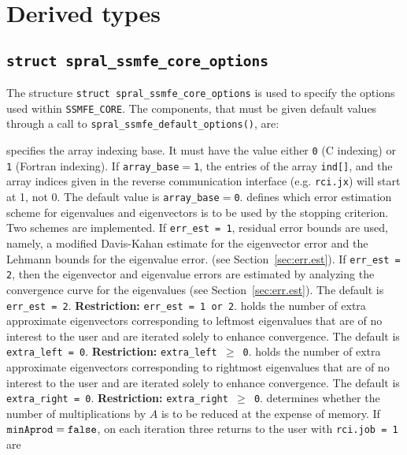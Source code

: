 \section{Derived types}
\subsection{\texttt{struct spral\_ssmfe\_core\_options}} \label{ssmfe:type:options}

The structure {\tt struct spral\_ssmfe\_core\_options} is used to specify
the options used within {\tt SSMFE\_CORE}. The components, that must be given
default values through a call to \texttt{spral\_ssmfe\_default\_options()}, are:

\begin{description}
%
 specifies the array indexing base. It must
   have the value either \texttt{0} (C indexing) or \texttt{1} (Fortran
   indexing). If \texttt{array\_base}$=$\texttt{1}, the entries of the array
   \texttt{ind[]}, and the array indices given in the reverse communication
   interface (e.g. \texttt{rci.jx}) will start at 1, not 0.
   The default value is \texttt{array\_base}$=$\texttt{0}.
%
defines which error estimation scheme 
for eigenvalues and eigenvectors
is to be used by the stopping criterion.
Two schemes are implemented.
If {\tt err\_est = 1}, residual error bounds are used,
namely,
a modified Davis-Kahan estimate for the eigenvector error
and
the Lehmann bounds for the eigenvalue error.
(see Section~\ref{sec:err.est}).
If {\tt err\_est = 2}, 
then the eigenvector and eigenvalue errors
are estimated by analyzing the convergence curve
for the eigenvalues (see Section~\ref{sec:err.est}).
The default is {\tt err\_est = 2}.
{\bf Restriction:} {\tt err\_est = 1 {\rm or} 2}.
%
holds the number of extra approximate eigenvectors
corresponding to leftmost eigenvalues
that are of no interest to the user
and are iterated solely to enhance convergence.
The default is {\tt extra\_left = 0}.
{\bf Restriction:} {\tt extra\_left $\ge$ 0}.
%
holds the number of extra approximate eigenvectors
corresponding to rightmost eigenvalues
that are of no interest to the user
and are iterated solely to enhance convergence.
The default is {\tt extra\_right = 0}.
{\bf Restriction:} {\tt extra\_right $\ge$ 0}.
%
determines whether the number of multiplications by $A$ 
is to be reduced at the expense of memory. 
If ${\tt minAprod = false}$, 
on each iteration three returns to the user
with {\tt rci.job = 1} are

\end{description}
